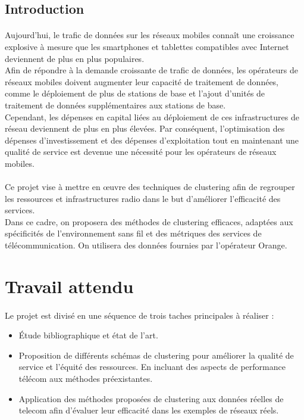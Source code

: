 \documentclass{article}
\begin{document}
  \begin{center}
\section*{\LARGE{Introduction}}
  \end{center}
\Large{\paragraph{}
        Aujourd'hui, le trafic de données sur les réseaux mobiles connaît une croissance explosive à mesure que les smartphones et tablettes compatibles avec Internet deviennent de plus en plus populaires.\\
Afin de répondre à la demande croissante de trafic de données, les opérateurs de réseaux mobiles doivent augmenter leur capacité de traitement de données, comme le déploiement de plus de stations de base et l'ajout d'unités de traitement de données supplémentaires aux stations de base. \\
Cependant, les dépenses en capital liées au déploiement de ces infrastructures de réseau deviennent de plus en plus élevées. Par conséquent, l'optimisation des dépenses d'investissement et des dépenses d'exploitation tout en maintenant une qualité de service est devenue une nécessité pour les opérateurs de réseaux mobiles.
\paragraph{}
Ce projet vise à mettre en œuvre des techniques de clustering afin de regrouper les ressources et infrastructures radio dans le but d'améliorer l'efficacité des services. \\
Dans ce cadre, on proposera des méthodes de clustering efficaces, adaptées aux spécificités de l'environnement sans fil et des métriques des services de télécommunication. On utilisera des données fournies par l'opérateur Orange.
}
\newpage

\section{Travail attendu}
\paragraph{}
 Le projet est divisé en une séquence de trois taches principales à réaliser : \\
\begin{itemize}
    \item Étude bibliographique et état de l'art. 
    \item Proposition de différents schémas de clustering pour améliorer la qualité de service et l'équité des ressources. En incluant des aspects de performance télécom aux méthodes préexistantes.
    \item Application des méthodes proposées de clustering aux données réelles de telecom afin d'évaluer leur efficacité dans les exemples de réseaux réels.
\end{itemize}
\end{document}
